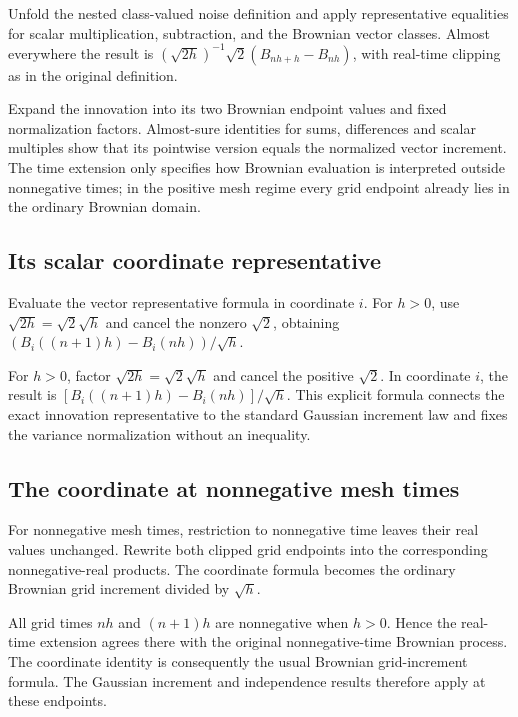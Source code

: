 \documentclass[11pt,a4paper]{article}
\begin{document}
Unfold the nested class-valued noise definition and apply representative equalities for scalar multiplication, subtraction, and the Brownian vector classes. Almost everywhere the result is \((\sqrt{2h})^{-1}\sqrt2(B_{nh+h}-B_{nh})\), with real-time clipping as in the original definition.



Expand the innovation into its two Brownian endpoint values and fixed normalization factors. Almost-sure identities for sums, differences and scalar multiples show that its pointwise version equals the normalized vector increment. The time extension only specifies how Brownian evaluation is interpreted outside nonnegative times; in the positive mesh regime every grid endpoint already lies in the ordinary Brownian domain.


\subsection{\texorpdfstring{Its scalar coordinate representative}{Its scalar coordinate representative}}


Evaluate the vector representative formula in coordinate \(i\). For \(h>0\), use \(\sqrt{2h}=\sqrt2\sqrt h\) and cancel the nonzero \(\sqrt2\), obtaining \((B_i((n+1)h)-B_i(nh))/\sqrt h\).



For \(h>0\), factor \(\sqrt{2h}=\sqrt2\sqrt h\) and cancel the positive \(\sqrt2\). In coordinate \(i\), the result is \([B_i((n+1)h)-B_i(nh)]/\sqrt h\). This explicit formula connects the exact innovation representative to the standard Gaussian increment law and fixes the variance normalization without an inequality.


\subsection{\texorpdfstring{The coordinate at nonnegative mesh times}{The coordinate at nonnegative mesh times}}


For nonnegative mesh times, restriction to nonnegative time leaves their real values unchanged. Rewrite both clipped grid endpoints into the corresponding nonnegative-real products. The coordinate formula becomes the ordinary Brownian grid increment divided by \(\sqrt h\).



All grid times \(nh\) and \((n+1)h\) are nonnegative when \(h>0\). Hence the real-time extension agrees there with the original nonnegative-time Brownian process. The coordinate identity is consequently the usual Brownian grid-increment formula. The Gaussian increment and independence results therefore apply at these endpoints.
\end{document}
